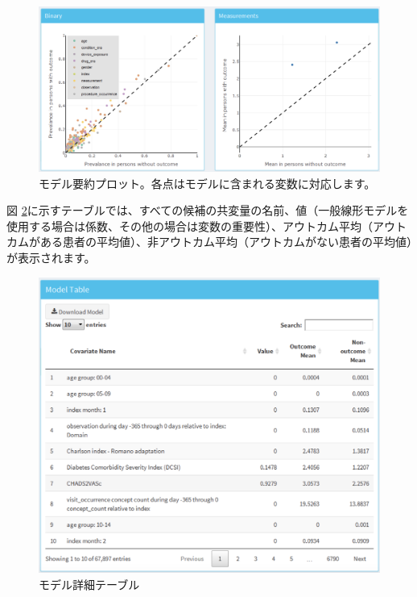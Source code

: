 \documentclass[
  11pt]{book}
\theoremstyle{definition}
\theoremstyle{definition}
\theoremstyle{definition}
\theoremstyle{definition}
\theoremstyle{remark}
\begin{document}
\begin{figure}

{\centering \includegraphics[width=1\linewidth]{images/PatientLevelPrediction/shiny/shinyModelPlots} 

}

\caption{モデル要約プロット。各点はモデルに含まれる変数に対応します。}\label{fig:shinyModelPlots}
\end{figure}

図 \ref{fig:shinyModelTable}に示すテーブルでは、すべての候補の共変量の名前、値（一般線形モデルを使用する場合は係数、その他の場合は変数の重要性）、アウトカム平均（アウトカムがある患者の平均値）、非アウトカム平均（アウトカムがない患者の平均値）が表示されます。

\begin{figure}

{\centering \includegraphics[width=1\linewidth]{images/PatientLevelPrediction/shiny/shinyModelTable} 

}

\caption{モデル詳細テーブル}\label{fig:shinyModelTable}
\end{figure}
\end{document}
